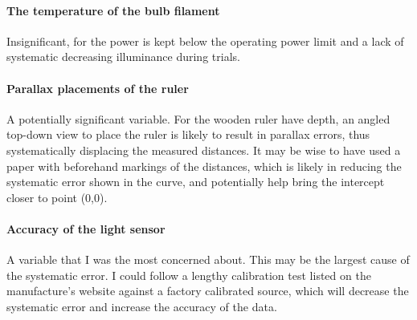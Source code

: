 \documentclass[a4paper,12pt]{article}
\begin{document}
\paragraph{The temperature of the bulb filament}
Insignificant, for the power is kept below the operating power limit and a lack of systematic decreasing illuminance during trials.

\paragraph{Parallax placements of the ruler}
A potentially significant variable. For the wooden ruler have depth, an angled top-down view to place the ruler is likely to result in parallax errors, thus systematically displacing the measured distances. It may be wise to have used a paper with beforehand markings of the distances, which is likely in reducing the systematic error shown in the curve, and potentially help bring the intercept closer to point (0,0).

\paragraph{Accuracy of the light sensor}
A variable that I was the most concerned about. This may be the largest cause of the systematic error. I could follow a lengthy calibration test listed on the manufacture's website against a factory calibrated source, which will decrease the systematic error and increase the accuracy of the data.

\newpage
\nocite{*}
\printbibliography
\end{document}
